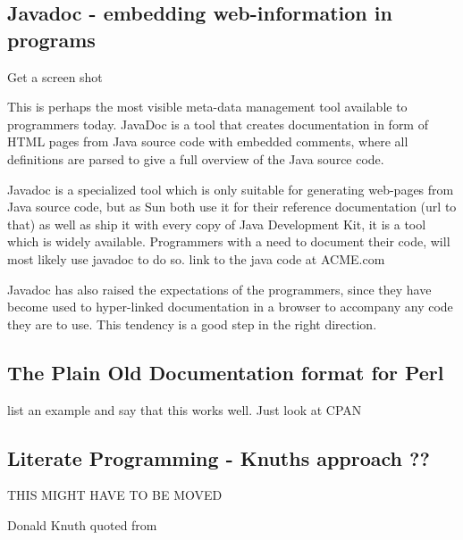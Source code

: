 \subsection{Javadoc - embedding web-information in programs}
\label{sec:javadoc}

\textsf{Get a screen shot}

This is perhaps the most visible meta-data management tool available
to programmers today.  \textsf{JavaDoc} is a tool that creates
documentation in form of HTML pages from Java source code with
embedded comments, \textsf{where all definitions are parsed to give a
  full overview of the Java source code}.

Javadoc is a specialized tool which is only suitable for generating
web-pages from Java source code, but as Sun both use it for their
reference documentation (\textsf{url to that}) as well as ship it with
every copy of Java Development Kit, it is a tool which is widely
available.  Programmers with a need to document their code, will most
likely use javadoc to do so.  \textsf{link to the java code at
ACME.com}

Javadoc has also raised the expectations of the programmers, since
they have become used to hyper-linked documentation in a browser to
accompany any code they are to use.  This tendency is a good step in
the right direction.


\subsection{The Plain Old Documentation format for Perl}
\label{sec:perlpod}

\textsf{list an example and say that this works well.  Just look at CPAN}

\subsection{Literate Programming - Knuths approach \textsf{??}}
\label{sec:literate-programming}

\textsf{THIS MIGHT HAVE TO BE MOVED}

%
{Donald Knuth}%
{\cite{knuthliterateprogramming} quoted from
  }

